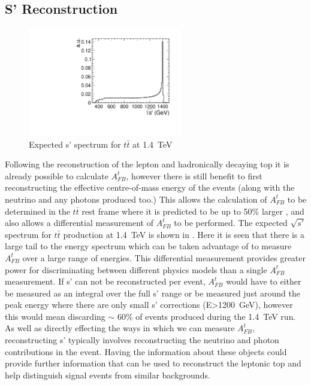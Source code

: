 \subsection{S' Reconstruction}

\begin{figure}
  \centering
  \includegraphics[width=0.6\textwidth]{TopAnalysis/figures/GeneratorSPrime.pdf}
  \caption[Expected s' spectrum for $t\bar{t}$ at 1.4~TeV]{Expected s' spectrum for $t\bar{t}$ at 1.4~TeV}
  \label{fig:trueSPrime}
\end{figure}

Following the reconstruction of the lepton and hadronically decaying top it is already possible to calculate $A_{FB}^{t}$, however there is still benefit to first reconstructing the effective centre-of-mass energy of the events (along with the neutrino and any photons produced too.) This allows the calculation of $A_{FB}^{t}$ to be determined in the $t\bar{t}$ rest frame where it is predicted to be up to 50\% larger \cite{Krohn:2011tw}, and also allows a differential measurement of $A_{FB}^{t}$ to be performed. The expected $\sqrt{s'}$ spectrum for $t\bar{t}$ production at 1.4~TeV is shown in . Here it is seen that there is a large tail to the energy spectrum which can be taken advantage of to measure $A_{FB}^{t}$ over a large range of energies. This differential measurement provides greater power for discriminating between different physics models than a single $A_{FB}^{t}$ measurement. If s' can not be reconstructed per event, $A_{FB}^{t}$ would have to either be measured as an integral over the full s' range or be measured just around the peak energy where there are only small s' corrections (E>1200~GeV), however this would mean discarding $\sim$ 60\% of events produced during the 1.4~TeV run. As well as directly effecting the ways in which we can measure $A_{FB}^{t}$, reconstructing s' typically involves reconstructing the neutrino and photon contributions in the event. Having the information about these objects could provide further information that can be used to reconstruct the leptonic top and help distinguish signal events from similar backgrounds.

